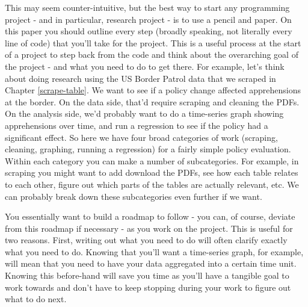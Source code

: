 \documentclass[
  12pt,
]{book}
\begin{document}
This may seem counter-intuitive, but the best way to start any programming project - and in particular, research project - is to use a pencil and paper. On this paper you should outline every step (broadly speaking, not literally every line of code) that you'll take for the project. This is a useful process at the start of a project to step back from the code and think about the overarching goal of the project - and what you need to do to get there. For example, let's think about doing research using the US Border Patrol data that we scraped in Chapter \ref{scrape-table}. We want to see if a policy change affected apprehensions at the border. On the data side, that'd require scraping and cleaning the PDFs. On the analysis side, we'd probably want to do a time-series graph showing apprehensions over time, and run a regression to see if the policy had a significant effect. So here we have four broad categories of work (scraping, cleaning, graphing, running a regression) for a fairly simple policy evaluation. Within each category you can make a number of subcategories. For example, in scraping you might want to add download the PDFs, see how each table relates to each other, figure out which parts of the tables are actually relevant, etc. We can probably break down these subcategories even further if we want.

You essentially want to build a roadmap to follow - you can, of course, deviate from this roadmap if necessary - as you work on the project. This is useful for two reasons. First, writing out what you need to do will often clarify exactly what you need to do. Knowing that you'll want a time-series graph, for example, will mean that you need to have your data aggregated into a certain time unit. Knowing this before-hand will save you time as you'll have a tangible goal to work towards and don't have to keep stopping during your work to figure out what to do next.
\end{document}
